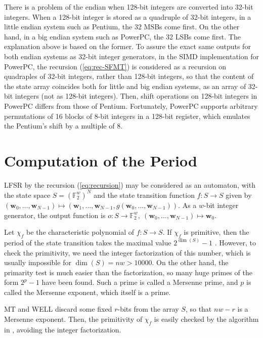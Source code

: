 \documentclass[acmnow]{acmtrans2m}
\def\F2{{\mathbb F}_2}
\def\bw{{{\mathbf w}}}
\begin{document}
There is a problem of the endian when 128-bit integers 
are converted into 32-bit integers. When a 128-bit integer
is stored as a quadruple of 32-bit integers, in a little
endian system such as Pentium, the 32 MSBs come first.
On the other hand, in a big endian system such as PowerPC,
the 32 LSBs come first. 
The explanation above is based on the former.
To assure the exact same outputs for both endian systems
as 32-bit integer generators, in the SIMD implementation 
for PowerPC, 
the recursion (\ref{eq:rec-SFMT}) is considered as 
a recursion on quadraples of 32-bit integers, rather than
128-bit integers, so that the content of the state array 
coincides both for little and big endian systems,
as an array of 32-bit integers (not as 128-bit integers).
Then, shift operations on 128-bit integers
in PowerPC differs from those of Pentium. 
Fortunately, 
PowerPC supports arbitrary permutations of 
16 blocks of 8-bit integers in a 128-bit register,
which emulates the Pentium's shift by a multiple of 8.

\appendix
\section{Computation of the Period}\label{sec:period}
LFSR by the recursion (\ref{eq:recursion})
may be considered as an automaton, 
with the state space $S=(\F2^{w})^{N}$
and the state transition function 
$f: S \to S$ given by
$(\bw_0,\ldots,\bw_{N-1})
\mapsto (\bw_1,\ldots,\bw_{N-1}, g(\bw_0,\ldots,\bw_{N-1}))$.  
As a $w$-bit integer generator, the output function is 
$o: S \to \F2^{w},\  (\bw_0,\ldots,\bw_{N-1}) \mapsto \bw_0$.

Let $\chi_f$ be the characteristic polynomial of $f:S \to S$.
If $\chi_f$ is primitive, then the 
period of the state transition takes the maximal value
$2^{\dim(S)}-1$ \cite[\S3.2.2]{knuth:bible}. 
However, to check the primitivity, we need
the integer factorization of this number, which is usually 
impossible for $\dim(S)=nw>10000$. 
On the other hand, the primarity test is much easier than 
the factorization, so many huge primes of the form 
$2^p-1$ have been found. 
Such a prime is called a Mersenne prime, and $p$ is
called the Mersenne exponent, which itself is a prime.

MT and WELL discard some fixed $r$-bits from the
array $S$, so that $nw-r$ is a Mersenne exponent. 
Then, the primitivity of $\chi_f$ is easily checked
by the algorithm in \cite[\S3.2.2]{knuth:bible},
avoiding the integer factorization.
\end{document}
